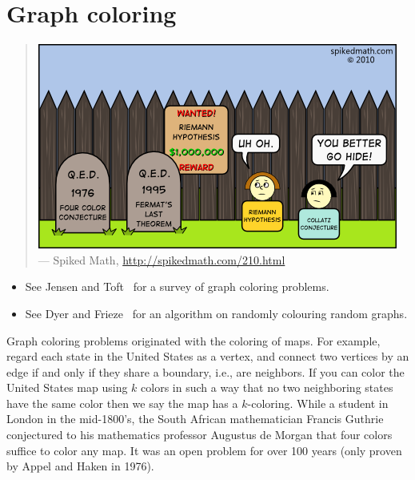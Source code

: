 
\chapter{Graph coloring}
\label{chap:graph_coloring}

\begin{quote}
\includegraphics[scale=1.0]{image/graph-coloring/four-color-conjecture-qed} \\
\noindent
--- Spiked Math,
\url{http://spikedmath.com/210.html}
\end{quote}

\begin{itemize}
\item See Jensen and Toft~\cite{JensenToft1995} for a survey of graph
  coloring problems.

\item See Dyer and Frieze~\cite{DyerFrieze2010} for an algorithm on
  randomly colouring random graphs.
\end{itemize}


Graph coloring problems originated with the coloring of maps. 
For example, regard each state in the United States as a vertex, 
and connect two vertices by an edge if and only if they share
a boundary, i.e., are neighbors. If you can color the United States 
map using $k$ colors in such a way that no two neighboring states have the 
same color then we say the map has a $k$-coloring. 
While a student in London in the mid-1800's, the South African mathematician
Francis Guthrie conjectured to his mathematics professor 
Augustus de Morgan that four colors suffice to color any map. 
It was an open problem for over 100 years (only proven by Appel
and Haken in 1976).


